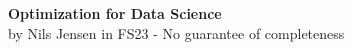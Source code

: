 \documentclass[8pt,landscape, a4paper]{extarticle}
\begin{document}
\raggedright
\footnotesize
\begin{multicols*}{3}

\setlength{\columnseprule}{0.25pt}
\setlength{\premulticols}{1pt}
\setlength{\postmulticols}{1pt}
\setlength{\multicolsep}{1pt}
\setlength{\columnsep}{2pt}


\begin{center}
	\Large{\textbf{Optimization for Data Science}} \\
    \small{by Nils Jensen in FS23 - No guarantee of completeness}
\end{center}


\newcommand\R{\mathbb{R}}
\newcommand\E{\mathbb{E}}
\newcommand\Q{\mathbb{Q}}
\newcommand\N{\mathbb{N}}
\newcommand\C{\mathbb{C}}
\newcommand\X{\mathcal{X}}
\newcommand\Y{\mathcal{Y}}
\newcommand\D{\mathcal{D}}
\newcommand{\veca}{\mathbf{a}}
\newcommand{\bb}{\mathbf{b}}
\newcommand{\vecd}{\mathbf{d}}
\newcommand{\ee}{\mathbf{e}}
\newcommand{\vecg}{\mathbf{g}}
\newcommand{\mm}{\mathbf{m}}
\newcommand{\vecs}{\mathbf{s}}
\newcommand{\uu}{\mathbf{u}}
\newcommand{\vv}{\mathbf{v}}
\newcommand{\ww}{\mathbf{w}}
\newcommand{\xx}{\mathbf{x}}
\newcommand{\yy}{\mathbf{y}}
\newcommand{\zz}{\mathbf{z}}
\newcommand{\rr}{\mathbf{r}}
\newcommand{\ssigma}{\boldsymbol{\sigma}}
\newcommand{\xxi}{\boldsymbol{\xi}}
\newcommand{\eeta}{\boldsymbol{\eta}}
\newcommand\Max{\mathrm{Max}}
\newcommand\argmin{\mathrm{argmin}}
\newcommand\relint{\mathrm{relint}}
\newcommand\argmax{\mathrm{argmax}}
\newcommand\prox{\mathrm{prox}}
\newcommand\Var{\mathrm{Var}}
\newcommand\Cov{\mathrm{Cov}}
\newcommand\conv{\mathrm{conv}}
\newcommand\diam{\mathrm{diam}}
\newcommand\sgn{\mathrm{sgn}}
\newcommand{\dom}{\textbf{dom}}
\newcommand\Min{\mathrm{Min}}
\newcommand\Limit{\lim_{n \rightarrow \infty}}
\newcommand\Sup{\mathrm{Sup}}
\newcommand\lmo{\mathrm{LMO}}
\newcommand\Inf{\mathrm{Inf}}
\newcommand\Def{\textbf{Def.}\hspace{3mm}}
\newcommand\Bsp{\textit{Bsp.}\hspace{2mm}}
\newcommand\Satz{\textbf{{Satz.}}\hspace{3mm}}
\newcommand\Kor{\textbf{Kor.}\hspace{3mm}}
\newcommand\Bem{\textbf{Bem.}\hspace{3mm}}
\newcommand\converges[2]{\underset{#1\rightarrow #2}{\longrightarrow}}
\newcommand{\BigO}{\mathcal{O}}

\newcommand\Sum{\sum\limits}
\newcommand\Lim{\lim\limits}
\newcommand\Int{\int\limits}


\end{multicols*}
\end{document}
